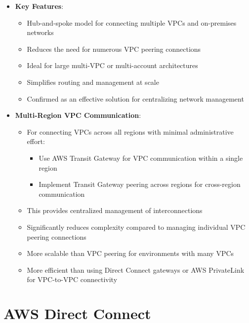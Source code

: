 \documentclass[11pt,a4paper]{report}
\begin{document}
\begin{itemize}
  \item \textbf{Key Features}:
\begin{itemize}
  \item Hub-and-spoke model for connecting multiple VPCs and on-premises networks
  \item Reduces the need for numerous VPC peering connections
  \item Ideal for large multi-VPC or multi-account architectures
  \item Simplifies routing and management at scale
  \item Confirmed as an effective solution for centralizing network management
\end{itemize}
  \item \textbf{Multi-Region VPC Communication}:
\begin{itemize}
  \item For connecting VPCs across all regions with minimal administrative effort:
\begin{itemize}
  \item Use AWS Transit Gateway for VPC communication within a single region
  \item Implement Transit Gateway peering across regions for cross-region communication
\end{itemize}
  \item This provides centralized management of interconnections
  \item Significantly reduces complexity compared to managing individual VPC peering connections
  \item More scalable than VPC peering for environments with many VPCs
  \item More efficient than using Direct Connect gateways or AWS PrivateLink for VPC-to-VPC connectivity
\end{itemize}
\end{itemize}


\section{AWS Direct Connect}
\end{document}
